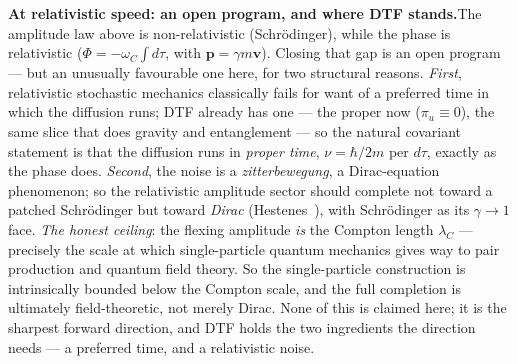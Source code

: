 \documentclass[11pt]{article}
\begin{document}
\begin{tcolorbox}[keybox]
\textbf{At relativistic speed: an open program, and where DTF stands.}\enspace The amplitude law above is
non-relativistic (Schr\"odinger), while the phase is relativistic ($\Phi=-\omega_C\!\int d\tau$, with
$\mathbf p=\gamma m\mathbf v$). Closing that gap is an open program --- but an unusually favourable one here,
for two structural reasons. \emph{First}, relativistic stochastic mechanics classically fails for want of a
preferred time in which the diffusion runs; DTF already has one --- the proper now ($\pi_u\equiv0$), the
same slice that does gravity and entanglement --- so the natural covariant statement is that the diffusion
runs in \emph{proper time}, $\nu=\hbar/2m$ per $d\tau$, exactly as the phase does. \emph{Second}, the noise
is a \emph{zitterbewegung}, a Dirac-equation phenomenon; so the relativistic amplitude sector should
complete not toward a patched Schr\"odinger but toward \emph{Dirac} (Hestenes~\cite{Hestenes1990}), with
Schr\"odinger as its $\gamma\to1$ face. \emph{The honest ceiling}: the flexing amplitude \emph{is} the
Compton length $\lambda_C$ --- precisely the scale at which single-particle quantum mechanics gives way to
pair production and quantum field theory. So the single-particle construction is intrinsically bounded below
the Compton scale, and the full completion is ultimately field-theoretic, not merely Dirac. None of this is
claimed here; it is the sharpest forward direction, and DTF holds the two ingredients the direction needs
--- a preferred time, and a relativistic noise.
\end{tcolorbox}
\end{document}
